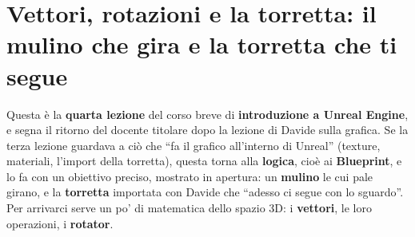 %
%
%    
%

\chapter[Vettori, rotazioni e la torretta]{Vettori, rotazioni e la torretta: il
mulino che gira e la torretta che ti segue}
\label{ue4:cap:torretta}

Questa è la \textbf{quarta lezione} del corso breve di \textbf{introduzione a Unreal
Engine}, e segna il ritorno del docente titolare dopo la lezione di Davide sulla
grafica. Se la terza lezione guardava a ciò che ``fa il grafico all'interno di Unreal''
(texture, materiali, l'import della torretta), questa torna alla \textbf{logica}, cioè
ai \textbf{Blueprint}, e lo fa con un obiettivo preciso, mostrato in apertura: un
\textbf{mulino} le cui pale girano, e la \textbf{torretta} importata con Davide che
``adesso ci segue con lo sguardo''. Per arrivarci serve un po' di matematica dello
spazio 3D: i \textbf{vettori}, le loro operazioni, i \textbf{rotator}.

